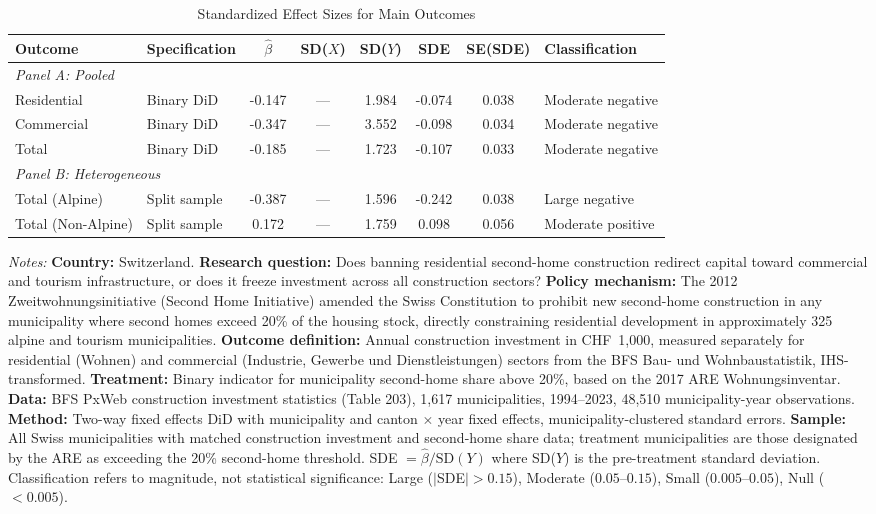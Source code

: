 \begin{table}[H]
\centering
\caption{Standardized Effect Sizes for Main Outcomes}
\label{tab:sde}
\begin{threeparttable}
\footnotesize
\begin{tabular}{llcccccl}
\toprule
Outcome & Specification & $\hat{\beta}$ & SD($X$) & SD($Y$) & SDE & SE(SDE) & Classification \\
\midrule
\multicolumn{8}{l}{\textit{Panel A: Pooled}} \\
Residential & Binary DiD & -0.147 & --- & 1.984 & -0.074 & 0.038 & Moderate negative \\
Commercial & Binary DiD & -0.347 & --- & 3.552 & -0.098 & 0.034 & Moderate negative \\
Total & Binary DiD & -0.185 & --- & 1.723 & -0.107 & 0.033 & Moderate negative \\
\midrule
\multicolumn{8}{l}{\textit{Panel B: Heterogeneous}} \\
Total (Alpine) & Split sample & -0.387 & --- & 1.596 & -0.242 & 0.038 & Large negative \\
Total (Non-Alpine) & Split sample & 0.172 & --- & 1.759 & 0.098 & 0.056 & Moderate positive \\
\bottomrule
\end{tabular}
\begin{tablenotes}[flushleft]
\scriptsize
\item \textit{Notes:} \textbf{Country:} Switzerland. \textbf{Research question:} Does banning residential second-home construction redirect capital toward commercial and tourism infrastructure, or does it freeze investment across all construction sectors? \textbf{Policy mechanism:} The 2012 Zweitwohnungsinitiative (Second Home Initiative) amended the Swiss Constitution to prohibit new second-home construction in any municipality where second homes exceed 20\% of the housing stock, directly constraining residential development in approximately 325 alpine and tourism municipalities. \textbf{Outcome definition:} Annual construction investment in CHF~1,000, measured separately for residential (Wohnen) and commercial (Industrie, Gewerbe und Dienstleistungen) sectors from the BFS Bau- und Wohnbaustatistik, IHS-transformed. \textbf{Treatment:} Binary indicator for municipality second-home share above 20\%, based on the 2017 ARE Wohnungsinventar. \textbf{Data:} BFS PxWeb construction investment statistics (Table 203), 1,617 municipalities, 1994--2023, 48,510 municipality-year observations. \textbf{Method:} Two-way fixed effects DiD with municipality and canton $\times$ year fixed effects, municipality-clustered standard errors. \textbf{Sample:} All Swiss municipalities with matched construction investment and second-home share data; treatment municipalities are those designated by the ARE as exceeding the 20\% second-home threshold. SDE $= \hat{\beta} / \text{SD}(Y)$ where SD($Y$) is the pre-treatment standard deviation. Classification refers to magnitude, not statistical significance: Large ($|$SDE$| > 0.15$), Moderate ($0.05$--$0.15$), Small ($0.005$--$0.05$), Null ($< 0.005$).
\end{tablenotes}
\end{threeparttable}
\end{table}

